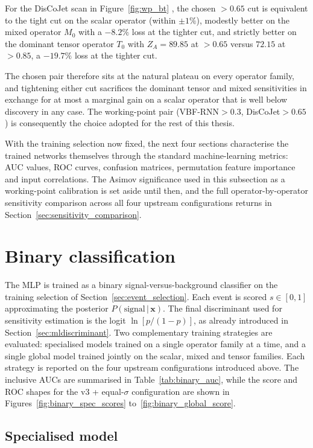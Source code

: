 For the DisCoJet scan in Figure~\ref{fig:wp_bt} , the chosen ${>}0.65$ cut is equivalent to the tight cut on the scalar operator (within $\pm 1\%$), modestly better on the mixed operator $M_0$ with a $-8.2\%$ loss at the tighter cut, and strictly better on the dominant tensor operator $T_0$ with $Z_A=89.85$ at ${>}0.65$ versus $72.15$ at ${>}0.85$, a $-19.7\%$ loss at the tighter cut.

The chosen pair therefore sits at the natural plateau on every operator family, and tightening either cut sacrifices the dominant tensor and mixed sensitivities in exchange for at most a marginal gain on a scalar operator that is well below discovery in any case. The working-point pair (VBF-RNN${}>0.3$, DisCoJet${}>0.65$) is consequently the choice adopted for the rest of this thesis.

With the training selection now fixed, the next four sections characterise the trained networks themselves through the standard machine-learning metrics: AUC values, ROC curves, confusion matrices, permutation feature importance and input correlations. The Asimov significance used in this subsection as a working-point calibration is set aside until then, and the full operator-by-operator sensitivity comparison across all four upstream configurations returns in Section~\ref{sec:sensitivity_comparison}.

\section{Binary classification}
\label{sec:binary_classification}

The MLP is trained as a binary signal-versus-background classifier on the training selection of Section~\ref{sec:event_selection}. Each event is scored $s\in[0,1]$ approximating the posterior $P(\mathrm{signal}\,|\,\mathbf{x})$. The final discriminant used for sensitivity estimation is the logit $\ln[p/(1-p)]$, as already introduced in Section~\ref{sec:mldiscriminant}. Two complementary training strategies are evaluated: specialised models trained on a single operator family at a time, and a single global model trained jointly on the scalar, mixed and tensor families. Each strategy is reported on the four upstream configurations introduced above. The inclusive AUCs are summarised in Table~\ref{tab:binary_auc}, while the score and ROC shapes for the v3 + equal-$\sigma$ configuration are shown in Figures~\ref{fig:binary_spec_scores} to~\ref{fig:binary_global_score}.

\subsection{Specialised model}
\label{sec:binary_specialised}


